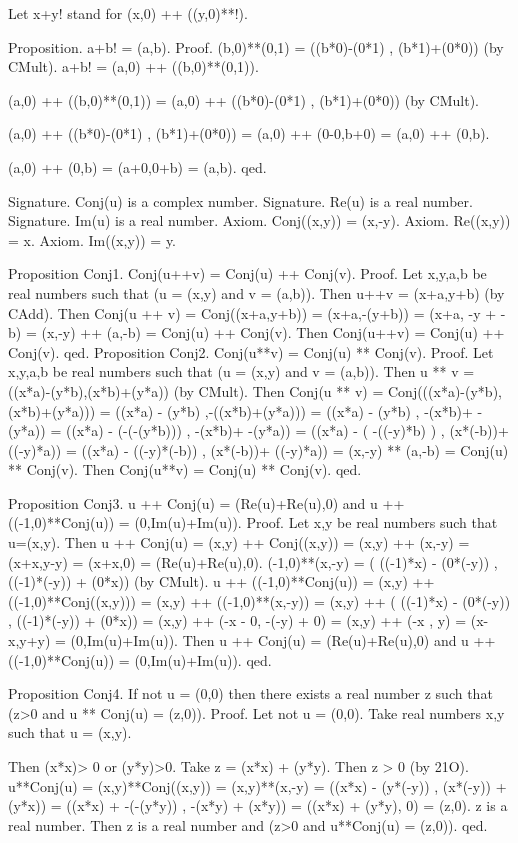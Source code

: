 \documentclass{article}
\newenvironment{forthel}{\begin{leftbar}}{\end{leftbar}}
\begin{document}
\begin{forthel}
Let x+y! stand for (x,0) ++ ((y,0)**!).


Proposition. a+b! = (a,b).
Proof. 	(b,0)**(0,1) = ((b*0)-(0*1) , (b*1)+(0*0)) (by CMult).
a+b! = (a,0) ++ ((b,0)**(0,1)). 

(a,0) ++ ((b,0)**(0,1))
= (a,0) ++ ((b*0)-(0*1) , (b*1)+(0*0)) (by CMult).

(a,0) ++ ((b*0)-(0*1) , (b*1)+(0*0))
= (a,0) ++ (0-0,b+0) 
= (a,0) ++ (0,b).

(a,0) ++ (0,b)
= (a+0,0+b) 
= (a,b).
qed.


Signature. Conj(u) is a complex number.
Signature. Re(u) is a real number.
Signature. Im(u) is a real number.
Axiom. Conj((x,y)) = (x,-y).
Axiom. Re((x,y)) = x.
Axiom. Im((x,y)) = y.

Proposition Conj1. Conj(u++v) = Conj(u) ++ Conj(v).
Proof. 	Let x,y,a,b be real numbers such that (u = (x,y) and v = (a,b)).
Then u++v = (x+a,y+b) (by CAdd).
Then Conj(u ++ v) = Conj((x+a,y+b)) = (x+a,-(y+b)) = (x+a, -y + -b) = (x,-y) ++ (a,-b) = Conj(u) ++ Conj(v).
Then Conj(u++v) = Conj(u) ++ Conj(v).
qed.		
Proposition Conj2. Conj(u**v) = Conj(u) ** Conj(v).
Proof. 	Let x,y,a,b be real numbers such that (u = (x,y) and v = (a,b)).
Then u ** v = ((x*a)-(y*b),(x*b)+(y*a)) (by CMult).
Then Conj(u ** v) 	= Conj(((x*a)-(y*b),(x*b)+(y*a))) 
= ((x*a) - (y*b)       ,-((x*b)+(y*a))) 
= ((x*a) - (y*b)       , -(x*b)+ -(y*a))
= ((x*a) - (-(-(y*b))) , -(x*b)+ -(y*a))
= ((x*a) - ( -((-y)*b) ) , (x*(-b))+ ((-y)*a))
= ((x*a) - ((-y)*(-b)) , (x*(-b))+ ((-y)*a))
= (x,-y) ** (a,-b)
= Conj(u) ** Conj(v). 
Then Conj(u**v) = Conj(u) ** Conj(v).
qed.

Proposition Conj3. u ++ Conj(u) = (Re(u)+Re(u),0) and u ++ ((-1,0)**Conj(u)) = (0,Im(u)+Im(u)).
Proof. Let x,y be real numbers such that u=(x,y).
Then u ++ Conj(u) = (x,y) ++ Conj((x,y)) = (x,y) ++ (x,-y) = (x+x,y-y) = (x+x,0) = (Re(u)+Re(u),0).
(-1,0)**(x,-y) = ( ((-1)*x) - (0*(-y)) , ((-1)*(-y)) + (0*x)) (by CMult).
u ++ ((-1,0)**Conj(u))	= (x,y) ++ ((-1,0)**Conj((x,y))) = (x,y) ++ ((-1,0)**(x,-y)) 
= (x,y) ++ ( ((-1)*x) - (0*(-y)) , ((-1)*(-y)) + (0*x))
= (x,y) ++ (-x - 0, -(-y) + 0)
= (x,y) ++ (-x , y) = (x-x,y+y) = (0,Im(u)+Im(u)).
Then u ++ Conj(u) = (Re(u)+Re(u),0) and u ++ ((-1,0)**Conj(u)) = (0,Im(u)+Im(u)).
qed.	   

Proposition Conj4. If not u = (0,0) then there exists a real number z such that (z>0 and u ** Conj(u) = (z,0)).
Proof.	Let not u = (0,0).
Take real numbers x,y such that u = (x,y).

Then (x*x)> 0 or (y*y)>0. Take z = (x*x) + (y*y). 
Then z > 0 (by 21O).
u**Conj(u) = (x,y)**Conj((x,y)) = (x,y)**(x,-y) = ((x*x) - (y*(-y)) , (x*(-y)) + (y*x)) = ((x*x) + -(-(y*y)) , -(x*y) + (x*y)) = ((x*x) + (y*y), 0) = (z,0).
z is a real number.
Then z is a real number and (z>0 and u**Conj(u) = (z,0)).
qed.


\end{forthel}
\end{document}
